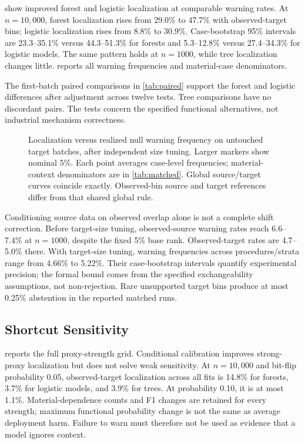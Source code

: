 \documentclass[conference]{IEEEtran}
\begin{document}
 show improved forest and logistic localization at comparable warning rates. At $n=10{,}000$, forest localization rises from 29.0\% to 47.7\% with observed-target bins; logistic localization rises from 8.8\% to 30.9\%. Case-bootstrap 95\% intervals are 23.3--35.1\% versus 44.3--51.3\% for forests and 5.3--12.8\% versus 27.4--34.3\% for logistic models. The same pattern holds at $n=1000$, while tree localization changes little.  reports all warning frequencies and material-case denominators.

The first-batch paired comparisons in \cref{tab:paired} support the forest and logistic differences after adjustment across twelve tests. Tree comparisons have no discordant pairs. The tests concern the specified functional alternatives, not industrial mechanism correctness.

\begin{figure}[t]
\centering

\caption{Localization versus realized null warning frequency on untouched target batches, after independent size tuning. Larger markers show nominal 5\%. Each point averages case-level frequencies; material-context denominators are in \cref{tab:matched}. Global source/target curves coincide exactly. Observed-bin source and target references differ from that shared global rule.}
\label{fig:size-power}
\end{figure}

Conditioning source data on observed overlap alone is not a complete shift correction. Before target-size tuning, observed-source warning rates reach 6.6--7.4\% at $n=1000$, despite the fixed 5\% base rank. Observed-target rates are 4.7--5.0\% there. With target-size tuning, warning frequencies across procedures/strata range from 4.66\% to 5.22\%. Their case-bootstrap intervals quantify experimental precision; the formal bound comes from the specified exchangeability assumptions, not non-rejection. Rare unsupported target bins produce at most 0.25\% abstention in the reported matched runs.

\subsection{Shortcut Sensitivity}
 reports the full proxy-strength grid. Conditional calibration improves strong-proxy localization but does not solve weak sensitivity. At $n=10{,}000$ and bit-flip probability 0.05, observed-target localization across all fits is 14.8\% for forests, 3.7\% for logistic models, and 3.9\% for trees. At probability 0.10, it is at most 1.1\%. Material-dependence counts and F1 changes are retained for every strength; maximum functional probability change is not the same as average deployment harm. Failure to warn must therefore not be used as evidence that a model ignores context.
\end{document}
